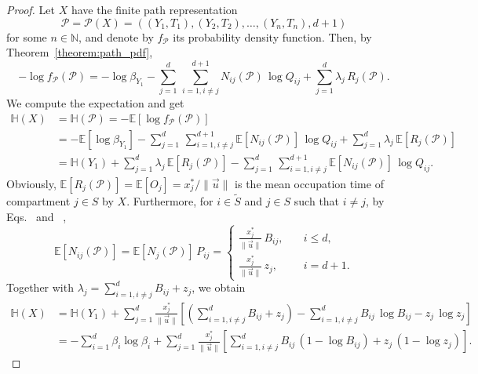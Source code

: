 \documentclass[smallextended]{svjour3}
\makeatletter
\renewcommand*{\eqref}[1]{%
  \hyperref[{#1}]{\textup{\tagform@{\ref*{#1}}}}%
}
\newcommand{\N}{\mathbb{N}}
\newcommand{\E}{\mathbb{E}}
\renewcommand{\H}{\mathbb{H}}
\newcommand{\suml}{\sum\limits}
\newcommand{\vnorms}[1]{\|#1\|}
\newcommand{\pdf}{probability density function}
\makeatother
\begin{document}
\begin{proof}
	Let $X$ have the finite path representation 
	\begin{equation*}
		\mathcal{P}=\mathcal{P}(X)=((Y_1,T_1),(Y_2,T_2),\ldots,(Y_n,T_n),d+1)
	\end{equation*}
	for some $n\in\N$, and denote by $f_{\mathcal{P}}$ its \pdf.
	Then, by Theorem~\ref{theorem:path_pdf},
	\begin{equation*}
		-\log f_{\mathcal{P}}(\mathcal{P}) = -\log\beta_{Y_1} - \suml_{j=1}^d\,\suml_{i=1,i\neq j}^{d+1}N_{ij}(\mathcal{P})\,\log Q_{ij} + \suml_{j=1}^d \lambda_j\,R_j(\mathcal{P}).
	\end{equation*}
	We compute the expectation and get
	\begin{align*}
		\H(X) &= \H(\mathcal{P}) = -\E\left[\log f_{\mathcal{P}}(\mathcal{P})\right]\\
		&= -\E\left[\log\beta_{Y_1}\right] - \suml_{j=1}^d\,\suml_{i=1,i\neq j}^{d+1}\E\left[N_{ij}(\mathcal{P})\right]\,\log Q_{ij} + \suml_{j=1}^d \lambda_j\,\E\left[R_j(\mathcal{P})\right]\\
		&= \H(Y_1) + \suml_{j=1}^d \lambda_j\,\E\left[R_j(\mathcal{P})\right] - \suml_{j=1}^d\,\suml_{i=1,i\neq j}^{d+1}\E\left[N_{ij}(\mathcal{P})\right]\,\log Q_{ij}.
	\end{align*}
	Obviously, $\E\left[R_j(\mathcal{P})\right]=\E\left[O_j\right]=x^\ast_j/\vnorms{\vec{u}}$ is the mean occupation time of compartment $j\in S$ by $X$.
	Furthermore, for $i\in\widetilde{S}$ and $j\in S$ such that $i\neq j$, by Eqs.~\eqref{eqn:N_i} and~\eqref{eqn:P_ij},
	\begin{equation*}
		\E\left[N_{ij}(\mathcal{P})\right] = \E\left[N_j(\mathcal{P})\right]\,P_{ij} = 
		\begin{cases}
			\frac{x^\ast_j}{\vnorms{\vec{u}}}\,B_{ij},\quad & i\leq d,\\
			\frac{x^\ast_j}{\vnorms{\vec{u}}}\,z_j,&i=d+1.
		\end{cases}
	\end{equation*}
	Together with $\lambda_j=\sum_{i=1,i\neq j}^{d} B_{ij}+z_j$, we obtain
	\begin{align*}
		\H(X) &= \H(Y_1) + \suml_{j=1}^d \frac{x^\ast_j}{\vnorms{\vec{u}}}\left[\left(\suml_{i=1,i\neq j}^d B_{ij}+z_j\right) - \suml_{i=1,i\neq j}^d B_{ij}\,\log B_{ij} - z_j\,\log z_j\right]\\
		&= -\suml_{i=1}^d \beta_i\log\beta_i + \suml_{j=1}^d \frac{x^\ast_j}{\vnorms{\vec{u}}} \left[\suml_{i=1,i\neq j}^d B_{ij}\,(1-\log B_{ij}) + z_j\,(1-\log z_j)\right].
	\end{align*}
\end{proof}
\end{document}
